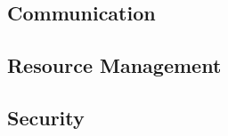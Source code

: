 
\subsection{Communication}
\label{ch:fundamentals/processes/communication}
\subsection{Resource Management}
\label{ch:fundamentals/processes/resource-management}
\subsection{Security}
\label{ch:fundamentals/processes/security}